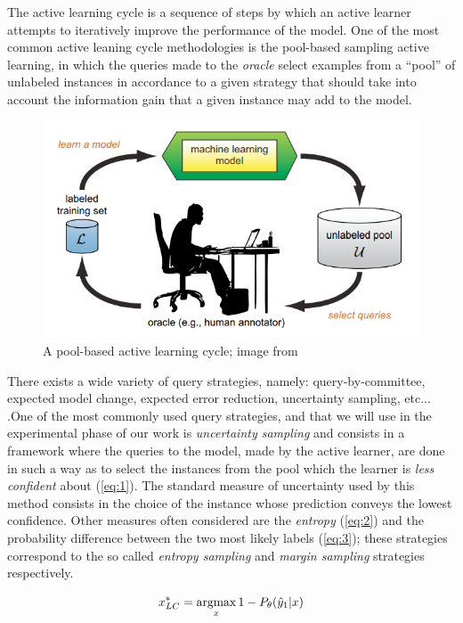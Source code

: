\documentclass[journal, a4paper]{IEEEtran}
\begin{document}
The active learning cycle is a sequence of steps by which an active learner attempts 
to iteratively improve the performance of the model. One of the most common active leaning 
cycle methodologies is the pool-based sampling active learning, in which the queries made to 
the \textit{oracle} select examples from a ``pool'' of  unlabeled instances in accordance 
to a given strategy that should take into account the information gain that a given instance 
may add to the model.

\begin{figure}[htpb]
    \centering
    \includegraphics[scale=0.38]{AL}
    \caption[AL]{A pool-based active learning cycle; image from \parencite{settles.tr09}}
    \label{al}
\end{figure}

There exists a wide variety of query strategies, namely: query-by-committee, expected model change,
expected error reduction, uncertainty sampling, etc... .One of the most commonly used query 
strategies, and that we will use in the experimental phase of our work is 
\textit{uncertainty sampling} and consists in a framework where the queries to the model, made by 
the active learner, are done in such a way as to select the instances from the pool which the 
learner is \textit{less confident} about (\ref{eq:1}). The standard measure of uncertainty used 
by this method consists in the choice of the instance whose prediction conveys the 
lowest confidence. Other measures often considered are the \textit{entropy} (\ref{eq:2}) 
and the probability difference between the two most likely labels (\ref{eq:3}); these 
strategies correspond to the so called \textit{entropy sampling} and \textit{margin sampling}
strategies respectively.

\begin{equation}
    \label{eq:1}
    \large{x^*_{LC} = \operatorname*{argmax}_x 1 
                       - P_{\theta}(\hat{y}_{1}|x)}
\end{equation}
\end{document}

